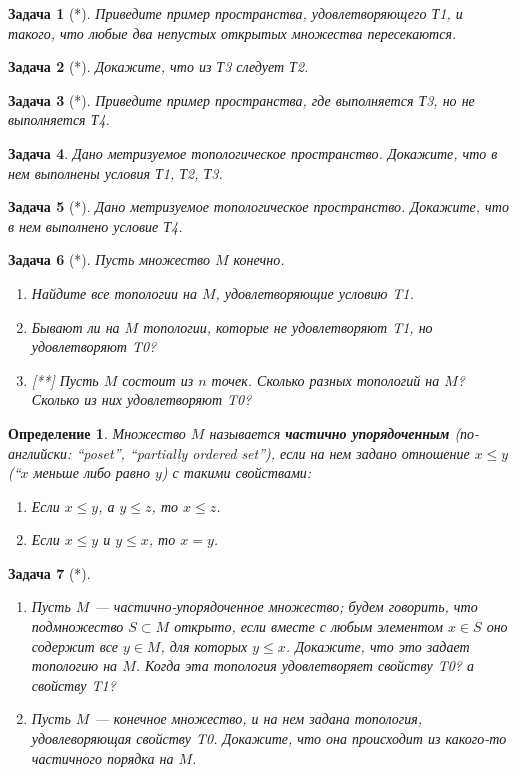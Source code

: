 \documentclass[12pt]{book}
\theoremstyle{upshape}
\newtheorem{zadacha}{Задача}[chapter]
\theoremstyle{generic}
\newtheorem{opredelenie}[teorema]{Определение}
\theoremstyle{upshapenonumber}
\renewcommand{\labelenumi}{\ralph{enumi}.}
\newcommand{\следствие}{%
     \refstepcounter{teorema}
     {\noindent\bf Следствие \thechapter.\arabic{teorema}:\ }}
\newcommand{\пример}{%
     \refstepcounter{teorema}
     {\noindent\bf Пример \thechapter.\arabic{teorema}:\ }}
\newcommand{\лемма}{%
     \refstepcounter{teorema}
     {\noindent\bf Лемма \thechapter.\arabic{teorema}:\ }}
\newcommand{\теорема}{%
     \refstepcounter{teorema}
     {\noindent\bf Теорема \thechapter.\arabic{teorema}:\ }}
\newcommand{\утверждение}{%
     \refstepcounter{teorema}
     {\noindent\bf Утверждение \thechapter.\arabic{teorema}:\ }}
\def\ит{\it}
\def\итем{\item %
}
\begin{document}
{%

\begin{zadacha}[*]
Приведите пример пространства, удовлетворяющего Т1, и такого, что
любые два непустых открытых множества пересекаются.
\end{zadacha}

\begin{zadacha}[*]
Докажите, что из Т3 следует Т2.
\end{zadacha}

\begin{zadacha}[*]
Приведите пример пространства, где выполняется Т3, но не выполняется
Т4.
\end{zadacha}

\begin{zadacha} 
Дано метризуемое топологическое пространство. Докажите, что в нем
выполнены условия Т1, Т2, Т3.
\end{zadacha}

\begin{zadacha}[*]
Дано метризуемое топологическое пространство. Докажите, что в нем
выполнено условие Т4.
\end{zadacha}

\begin{zadacha}[*]
Пусть множество $M$ конечно.
\begin{enumerate}
\итем Найдите все топологии на $M$, удовлетворяющие условию T1.
\итем Бывают ли на $M$ топологии, которые не удовлетворяют T1, но
  удовлетворяют T0?
\итем[**] Пусть $M$ состоит из $n$ точек.
Сколько разных топологий на $M$? Сколько из них
удовлетворяют T0?
\end{enumerate}
\end{zadacha}

\begin{opredelenie}
Множество $M$ называется {\bf частично упорядоченным}
(по-английски: ``poset'', ``partially ordered set''), если на нем
задано отношение $x \le y$ (``$x$ меньше либо равно $y$) с
такими  свойствами:
\begin{enumerate}
\renewcommand{\labelenumi}{\arabic{enumi}.}
\item Если $x \le y$, а $y \le z$, то $x \le z$.
\item Если $x \le y$ и $y \le x$, то $x=y$.
\end{enumerate}
\end{opredelenie}

\begin{zadacha}[*]
\begin{enumerate}
\итем Пусть $M$ --- частично-упорядоченное множество; будем говорить,
  что подмножество $S \subset M$ открыто, если вместе с любым
  элементом $x \in S$ оно содержит все $y \in M$, для которых $y \le
  x$. Докажите, что это задает топологию на $M$. Когда эта топология
  удовлетворяет свойству T0? а свойству T1?
\итем Пусть $M$ --- конечное множество, и на нем задана топология,
  удовлеворяющая свойству T0. Докажите, что она происходит из
  какого-то частичного порядка на $M$.
\end{enumerate}
\end{zadacha}

}
\end{document}
